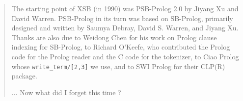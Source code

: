 \begin{quote}
The starting point of XSB (in 1990) was PSB-Prolog 2.0 by Jiyang Xu
and David Warren.  PSB-Prolog in its turn was based on SB-Prolog,
primarily designed and written by Saumya Debray, David S. Warren, and
Jiyang Xu.  Thanks are also due to Weidong Chen for his work on Prolog
clause indexing for SB-Prolog, to Richard O'Keefe, who contributed the
Prolog code for the Prolog reader and the C code for the tokenizer, to
Ciao Prolog whose {\tt write\_term/[2,3]} we use, and to SWI Prolog
for their CLP(R) package.

... Now what did I forget this time ?

\end{quote}

